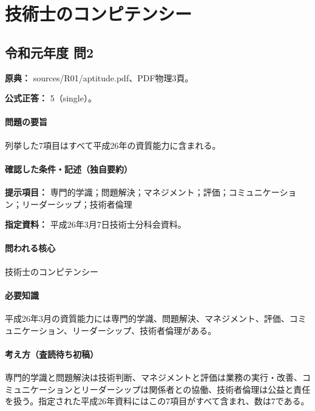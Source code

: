 \section{技術士のコンピテンシー}

\subsection{令和元年度 問2}
\label{q:r01-reg-apt-02}

\noindent\textbf{原典：} sources/R01/aptitude.pdf、PDF物理3頁。

\textbf{公式正答：} 5（single）。

\paragraph{問題の要旨} 列挙した7項目はすべて平成26年の資質能力に含まれる。

\paragraph{確認した条件・記述（独自要約）}\mbox{}\par

\noindent\textbf{提示項目：} 専門的学識；問題解決；マネジメント；評価；コミュニケーション；リーダーシップ；技術者倫理\par

\noindent\textbf{指定資料：} 平成26年3月7日技術士分科会資料。\par

\paragraph{問われる核心} 技術士のコンピテンシー

\paragraph{必要知識} 平成26年3月の資質能力には専門的学識、問題解決、マネジメント、評価、コミュニケーション、リーダーシップ、技術者倫理がある。

\paragraph{考え方（査読待ち初稿）} 専門的学識と問題解決は技術判断、マネジメントと評価は業務の実行・改善、コミュニケーションとリーダーシップは関係者との協働、技術者倫理は公益と責任を扱う。指定された平成26年資料にはこの7項目がすべて含まれ、数は7である。

